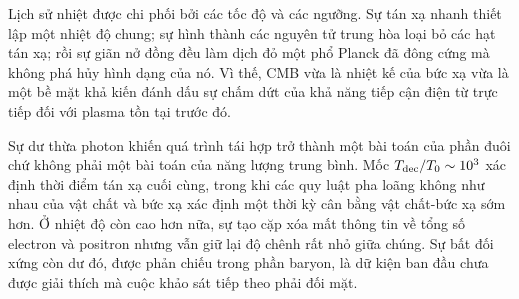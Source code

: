 Lịch sử nhiệt được chi phối bởi các tốc độ và các ngưỡng. Sự tán xạ nhanh thiết lập một nhiệt độ chung; sự hình thành các nguyên tử trung hòa loại bỏ các hạt tán xạ; rồi sự giãn nở đồng đều làm dịch đỏ một phổ Planck đã đông cứng mà không phá hủy hình dạng của nó. Vì thế, CMB vừa là nhiệt kế của bức xạ vừa là một bề mặt khả kiến đánh dấu sự chấm dứt của khả năng tiếp cận điện từ trực tiếp đối với plasma tồn tại trước đó.

Sự dư thừa photon khiến quá trình tái hợp trở thành một bài toán của phần đuôi chứ không phải một bài toán của năng lượng trung bình. Mốc \(T_{\rm dec}/T_0\sim10^3\) xác định thời điểm tán xạ cuối cùng, trong khi các quy luật pha loãng không như nhau của vật chất và bức xạ xác định một thời kỳ cân bằng vật chất-bức xạ sớm hơn. Ở nhiệt độ còn cao hơn nữa, sự tạo cặp xóa mất thông tin về tổng số electron và positron nhưng vẫn giữ lại độ chênh rất nhỏ giữa chúng. Sự bất đối xứng còn dư đó, được phản chiếu trong phần baryon, là dữ kiện ban đầu chưa được giải thích mà cuộc khảo sát tiếp theo phải đối mặt.